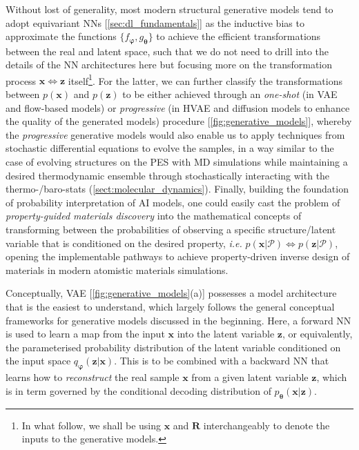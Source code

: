 Without lost of generality, most modern structural generative models\cite{xie2021crystal,midgley2023se,zeni2025generative,kohler2019equivariant,klein2023equivariant}  tend to adopt equivariant NNs [\cref{sec:dl_fundamentals}] as the inductive bias to approximate the functions $\{f_{\boldsymbol{\varphi}},g_{\boldsymbol{\theta}}\}$ to achieve the efficient transformations between the real and latent space, such that we do not need to drill into the details of the NN architectures here but focusing more on the transformation process $\bm{x}\Leftrightarrow\bm{z}$ itself\footnote{In what follow, we shall be using $\bm{x}$ and $\bm{R}$ interchangeably to denote the inputs to the generative models.}. For the latter, we can further classify the transformations between $p(\bm{x})$ and $p(\bm{z})$ to be either achieved through an \emph{one-shot} (in VAE and flow-based models) or \textit{progressive} (in HVAE and diffusion models to enhance the quality of the generated models) procedure [\cref{fig:generative_models}], whereby the \textit{progressive} generative models would also enable us  \cite{song2019generative,song2020score} to apply techniques from stochastic differential equations to evolve the samples, in a way similar to the case of evolving structures on the PES with MD simulations while maintaining a desired thermodynamic ensemble through stochastically interacting with the thermo-/baro-stats (\cref{sect:molecular_dynamics}). Finally, building the foundation of probability interpretation of AI models, one could easily cast the problem of \emph{property-guided materials discovery} into the mathematical concepts of transforming between the  probabilities  of observing a specific structure/latent variable that is conditioned on the desired property, \emph{i.e.} $p(\bm{x}|\mathcal{P})\Leftrightarrow p(\bm{z}|\mathcal{P})$,\cite{ho2022classifier}  opening the implementable pathways to achieve property-driven inverse design of materials in modern atomistic materials simulations.



Conceptually, VAE [\cref{fig:generative_models}(a)] possesses a model architecture that is the easiest to understand, which largely follows the general conceptual frameworks for generative models discussed in the beginning.  Here, a forward NN is used to learn a map from the input $\bm{x}$ into the latent variable $\bm{z}$, or equivalently, the parameterised probability distribution of the latent variable conditioned on the input space $q_{\boldsymbol{\varphi}}(\bm{z}|\bm{x})$. This is to be combined with a backward NN that learns how to \emph{reconstruct} the real sample $\bm{x}$ from a given latent variable $\bm{z}$, which is in term governed by the conditional decoding distribution of $p_{\boldsymbol{\theta}}(\bm{x}|\bm{z})$. 

